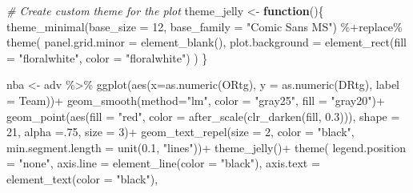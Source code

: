 \documentclass[
]{article}
\newenvironment{Shaded}{\begin{snugshade}}{\end{snugshade}}
\newcommand{\AttributeTok}[1]{\textcolor[rgb]{0.77,0.63,0.00}{#1}}
\newcommand{\CommentTok}[1]{\textcolor[rgb]{0.56,0.35,0.01}{\textit{#1}}}
\newcommand{\ControlFlowTok}[1]{\textcolor[rgb]{0.13,0.29,0.53}{\textbf{#1}}}
\newcommand{\DecValTok}[1]{\textcolor[rgb]{0.00,0.00,0.81}{#1}}
\newcommand{\FloatTok}[1]{\textcolor[rgb]{0.00,0.00,0.81}{#1}}
\newcommand{\FunctionTok}[1]{\textcolor[rgb]{0.00,0.00,0.00}{#1}}
\newcommand{\NormalTok}[1]{#1}
\newcommand{\OtherTok}[1]{\textcolor[rgb]{0.56,0.35,0.01}{#1}}
\newcommand{\SpecialCharTok}[1]{\textcolor[rgb]{0.00,0.00,0.00}{#1}}
\newcommand{\StringTok}[1]{\textcolor[rgb]{0.31,0.60,0.02}{#1}}
\begin{document}
\begin{Shaded}
\begin{Highlighting}[]
\CommentTok{\# Create custom theme for the plot }
\NormalTok{theme\_jelly }\OtherTok{\textless{}{-}} \ControlFlowTok{function}\NormalTok{()\{}
  \FunctionTok{theme\_minimal}\NormalTok{(}\AttributeTok{base\_size =} \DecValTok{12}\NormalTok{, }\AttributeTok{base\_family =} \StringTok{"Comic Sans MS"}\NormalTok{) }\SpecialCharTok{\%+replace\%}
    \FunctionTok{theme}\NormalTok{(}
      \AttributeTok{panel.grid.minor =} \FunctionTok{element\_blank}\NormalTok{(),}
      \AttributeTok{plot.background =} \FunctionTok{element\_rect}\NormalTok{(}\AttributeTok{fill =} \StringTok{"floralwhite"}\NormalTok{, }\AttributeTok{color =} \StringTok{"floralwhite"}\NormalTok{)}
\NormalTok{    )}
\NormalTok{\}}

\NormalTok{nba }\OtherTok{\textless{}{-}}\NormalTok{ adv }\SpecialCharTok{\%\textgreater{}\%}
  \FunctionTok{ggplot}\NormalTok{(}\FunctionTok{aes}\NormalTok{(}\AttributeTok{x=}\FunctionTok{as.numeric}\NormalTok{(ORtg), }\AttributeTok{y =} \FunctionTok{as.numeric}\NormalTok{(DRtg), }\AttributeTok{label =}\NormalTok{ Team))}\SpecialCharTok{+}
  \FunctionTok{geom\_smooth}\NormalTok{(}\AttributeTok{method=}\StringTok{"lm"}\NormalTok{, }\AttributeTok{color =} \StringTok{"gray25"}\NormalTok{, }\AttributeTok{fill =} \StringTok{"gray20"}\NormalTok{)}\SpecialCharTok{+}
  \FunctionTok{geom\_point}\NormalTok{(}\FunctionTok{aes}\NormalTok{(}\AttributeTok{fill =} \StringTok{"red"}\NormalTok{, }\AttributeTok{color =} \FunctionTok{after\_scale}\NormalTok{(}\FunctionTok{clr\_darken}\NormalTok{(fill, }\FloatTok{0.3}\NormalTok{))),}
             \AttributeTok{shape =} \DecValTok{21}\NormalTok{, }
             \AttributeTok{alpha =}\NormalTok{.}\DecValTok{75}\NormalTok{,}
             \AttributeTok{size =} \DecValTok{3}\NormalTok{)}\SpecialCharTok{+}
  \FunctionTok{geom\_text\_repel}\NormalTok{(}\AttributeTok{size =} \DecValTok{2}\NormalTok{, }\AttributeTok{color =} \StringTok{"black"}\NormalTok{, }\AttributeTok{min.segment.length =} \FunctionTok{unit}\NormalTok{(}\FloatTok{0.1}\NormalTok{, }\StringTok{"lines"}\NormalTok{))}\SpecialCharTok{+}
  \FunctionTok{theme\_jelly}\NormalTok{()}\SpecialCharTok{+}
  \FunctionTok{theme}\NormalTok{(}
    \AttributeTok{legend.position =} \StringTok{"none"}\NormalTok{,}
    \AttributeTok{axis.line =} \FunctionTok{element\_line}\NormalTok{(}\AttributeTok{color =} \StringTok{"black"}\NormalTok{),}
    \AttributeTok{axis.text =} \FunctionTok{element\_text}\NormalTok{(}\AttributeTok{color =} \StringTok{"black"}\NormalTok{),}

\end{Highlighting}
\end{Shaded}
\end{document}
